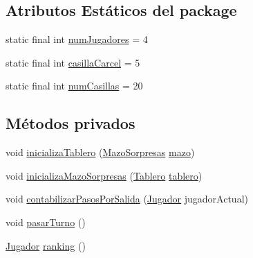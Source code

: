 \subsection*{Atributos Estáticos del \textquotesingle{}package\textquotesingle{}}
\begin{DoxyCompactItemize}
\item 
static final int \hyperlink{classcivitas_1_1CivitasJuego_a033144c8099bb68aef8cc77268d3bbd9}{num\+Jugadores} = 4
\item 
static final int \hyperlink{classcivitas_1_1CivitasJuego_a4cbc0506f7a7d9c8409cafc230989258}{casilla\+Carcel} = 5
\item 
static final int \hyperlink{classcivitas_1_1CivitasJuego_a749d70a3b81aaff78b75f52c74b08f41}{num\+Casillas} = 20
\end{DoxyCompactItemize}
\subsection*{Métodos privados}
\begin{DoxyCompactItemize}
\item 
void \hyperlink{classcivitas_1_1CivitasJuego_aae21b4f5cf5310530254baeac9540c39}{inicializa\+Tablero} (\hyperlink{classcivitas_1_1MazoSorpresas}{Mazo\+Sorpresas} \hyperlink{classcivitas_1_1CivitasJuego_a5e4c8b521eaa77f8b3ee7a011292bf44}{mazo})
\item 
void \hyperlink{classcivitas_1_1CivitasJuego_a876416b4d7cebecbb8ee9edda4343fd3}{inicializa\+Mazo\+Sorpresas} (\hyperlink{classcivitas_1_1Tablero}{Tablero} \hyperlink{classcivitas_1_1CivitasJuego_a826db446a6b18c2d6b5dc12a97aeed5f}{tablero})
\item 
void \hyperlink{classcivitas_1_1CivitasJuego_a557d212169fb3a5a44a6ddef88f2f95c}{contabilizar\+Pasos\+Por\+Salida} (\hyperlink{classcivitas_1_1Jugador}{Jugador} jugador\+Actual)
\item 
void \hyperlink{classcivitas_1_1CivitasJuego_ab693e9b502a23abfc60fdf90232018fe}{pasar\+Turno} ()
\item 
\hyperlink{classcivitas_1_1Jugador}{Jugador} \hyperlink{classcivitas_1_1CivitasJuego_a2f4592014f096ff1b251a6102f2455d9}{ranking} ()
\end{DoxyCompactItemize}
